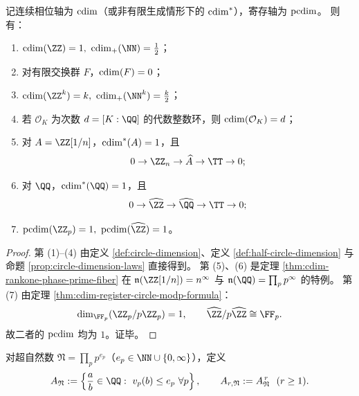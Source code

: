 \begin{proposition}[常见对象的双轴维度赋值]\label{prop:cdim-phase-register-common-assignments}
记连续相位轴为 \(\operatorname{cdim}\)（或非有限生成情形下的 \(\operatorname{cdim}^\ast\)），寄存轴为 \(\operatorname{pcdim}\)。
则有：
\begin{enumerate}
  \item \(\cdim(\ZZ)=1,\ \cdim_+(\NN)=\tfrac12\)；
  \item 对有限交换群 \(F\)，\(\operatorname{cdim}(F)=0\)；
  \item \(\cdim(\ZZ^k)=k,\ \cdim_+(\NN^k)=\tfrac{k}{2}\)；
  \item 若 \(\mathcal O_K\) 为次数 \(d=[K:\QQ]\) 的代数整数环，则 \(\operatorname{cdim}(\mathcal O_K)=d\)；
  \item 对 \(A=\ZZ[1/n]\)，\(\operatorname{cdim}^\ast(A)=1\)，且
  \[
  0\to \ZZ_n\to \widehat A\to\TT\to 0;
  \]
  \item 对 \(\QQ\)，\(\cdim^\ast(\QQ)=1\)，且
  \[
  0\to \widehat\ZZ\to \widehat\QQ\to\TT\to 0;
  \]
  \item \(\pcdim(\ZZ_p)=1,\ \pcdim(\widehat\ZZ)=1\)。
\end{enumerate}
\end{proposition}
\begin{proof}
第 (1)--(4) 由定义 \ref{def:circle-dimension}、定义 \ref{def:half-circle-dimension} 与命题 \ref{prop:circle-dimension-laws} 直接得到。
第 (5)、(6) 是定理 \ref{thm:cdim-rankone-phase-prime-fiber} 在
\(\mathfrak n(\ZZ[1/n])=n^\infty\) 与 \(\mathfrak n(\QQ)=\prod_p p^\infty\) 的特例。
第 (7) 由定理 \ref{thm:cdim-register-circle-modp-formula}：
\[
\dim_{\FF_p}(\ZZ_p/p\ZZ_p)=1,\qquad
\widehat\ZZ/p\widehat\ZZ\cong \FF_p.
\]
故二者的 \(\operatorname{pcdim}\) 均为 \(1\)。证毕。
\end{proof}

\begin{definition}[高秩超自然局部化模]\label{def:cdim-highrank-supernatural-localization}
对超自然数 \(\mathfrak N=\prod_p p^{e_p}\)（\(e_p\in\NN\cup\{0,\infty\}\)），定义
\[
A_{\mathfrak N}
:=
\left\{\frac{a}{b}\in\QQ:\ v_p(b)\le e_p\ \forall p\right\},
\qquad
A_{r,\mathfrak N}:=A_{\mathfrak N}^{\,r}\ \ (r\ge 1).
\]
\end{definition}

